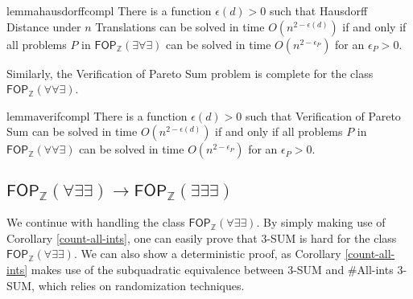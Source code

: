 \begin{restatable}{lemma}{hausdorffcompl}
	There is a function $\epsilon(d)>0$ such that Hausdorff Distance under $n$ Translations can be solved in time $O(n^{2-\epsilon(d)})$ if and only if all problems $P$ in 
	$\mathsf{FOP}_{\mathbb{Z}}(\exists \forall \exists)$ can be solved in time $O(n^{2-\epsilon_P})$ for an $\epsilon_P>0$.
	\label{Hausdorff-Completeness}
\end{restatable}
Similarly, the Verification of Pareto Sum problem is complete for the class $\mathsf{FOP}_{\mathbb{Z}}(\forall \forall \exists)$.
\begin{restatable}{lemma}{verifcompl}
	There is a function $\epsilon(d)>0$ such that Verification of Pareto Sum can be solved in time $O(n^{2-\epsilon(d)})$ if and only if all problems $P$ in 
	$\mathsf{FOP}_{\mathbb{Z}}(\forall \forall \exists)$ can be solved in time $O(n^{2-\epsilon_P})$ for an $\epsilon_P>0$.
	\label{Verif-Completeness}
  \end{restatable}


\subsection{$\mathsf{FOP}_{\mathbb{Z}}(\forall \exists \exists) \to \mathsf{FOP}_{\mathbb{Z}}(\exists \exists \exists)$ }

We continue with handling the class $\mathsf{FOP}_{\mathbb{Z}}(\forall \exists \exists)$.
By simply making use of Corollary \ref{count-all-ints}, one can easily prove that $3$-SUM is hard for the class $\mathsf{FOP}_{\mathbb{Z}}(\forall \exists \exists)$.
We can also show a deterministic proof, as Corollary \ref{count-all-ints} makes use of 
the subquadratic equivalence between $3$-SUM and $\#$All-ints $3$-SUM, which relies on randomization techniques.

\allintshard*



